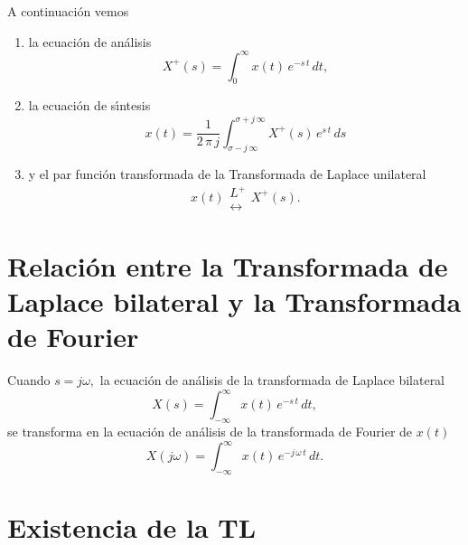 A continuaci\'{o}n vemos 
\begin{enumerate}
\item la ecuaci\'{o}n de an\'{a}lisis
\begin{equation}
	X^{+}\left( s\right) =\int_{0}^{\infty }x\left( t\right) \, e^{-s \, t} \, dt,
\end{equation}
\item la ecuaci\'{o}n de s\'{\i}ntesis 
\begin{equation}
  x\left( t\right) =  \frac{1}{2 \, \pi \, j}\int_{\sigma - j \, \infty }^{\sigma +j \, \infty}X^{+}\left( s\right) \, e^{s \, t} \, ds 
\end{equation}
\item y el par funci\'{o}n transformada de la Transformada de Laplace unilateral
\begin{equation}
  x\left( t\right) 
  \begin{array}{c}
    L^{+} \\
    \leftrightarrow
  \end{array}
  X^{+}\left( s\right).
\end{equation} 
\end{enumerate}

\section{Relaci\'{o}n entre la Transformada de Laplace bilateral y la Transformada de Fourier}


Cuando $s=j\omega ,$ la ecuaci\'{o}n de an\'{a}lisis de la transformada de Laplace bilateral
\begin{equation}
   X\left( s\right) = \int_{-\infty }^{\infty }x\left( t\right) \, e^{-s \, t} \, dt,
\end{equation}
se transforma en la  ecuaci\'{o}n de an\'{a}lisis de la transformada de Fourier de $x(t)$
\begin{equation}
        X\left( j\omega \right) =
                \int_{-\infty }^{\infty }x\left( t\right) \, e^{-j \, \omega \, t} \, dt.
\end{equation}


\section{Existencia de la TL}

